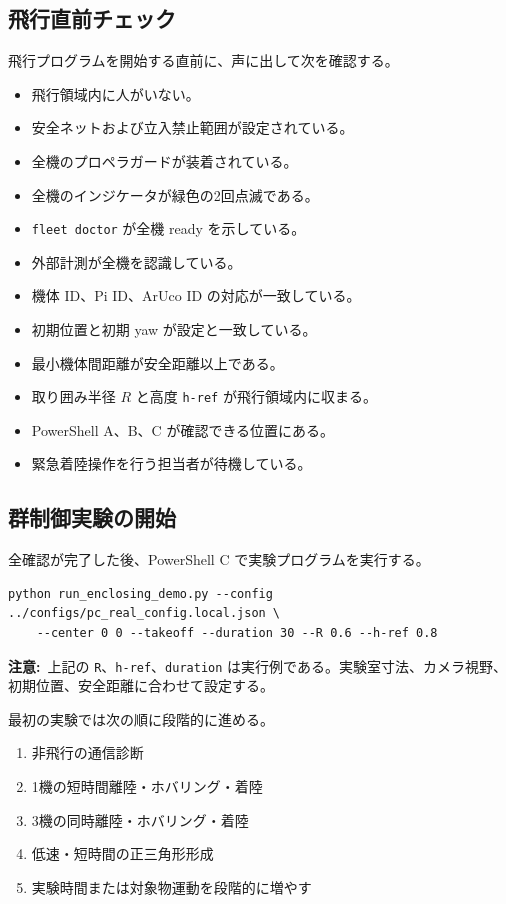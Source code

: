 \documentclass[11pt,a4paper]{ltjsarticle}
\newcommand{\code}[1]{\texttt{\small #1}}
\newcommand{\warning}[1]{\par\smallskip\noindent\textbf{注意:}~#1\par\smallskip}
\begin{document}
\subsection{飛行直前チェック}

飛行プログラムを開始する直前に、声に出して次を確認する。

\begin{itemize}[leftmargin=1.4em]
  \item 飛行領域内に人がいない。
  \item 安全ネットおよび立入禁止範囲が設定されている。
  \item 全機のプロペラガードが装着されている。
  \item 全機のインジケータが緑色の2回点滅である。
  \item \code{fleet doctor} が全機 ready を示している。
  \item 外部計測が全機を認識している。
  \item 機体 ID、Pi ID、ArUco ID の対応が一致している。
  \item 初期位置と初期 yaw が設定と一致している。
  \item 最小機体間距離が安全距離以上である。
  \item 取り囲み半径 $R$ と高度 \code{h-ref} が飛行領域内に収まる。
  \item PowerShell A、B、C が確認できる位置にある。
  \item 緊急着陸操作を行う担当者が待機している。
\end{itemize}

\subsection{群制御実験の開始}

全確認が完了した後、PowerShell C で実験プログラムを実行する。

\begin{lstlisting}
python run_enclosing_demo.py --config ../configs/pc_real_config.local.json \
    --center 0 0 --takeoff --duration 30 --R 0.6 --h-ref 0.8
\end{lstlisting}

\warning{上記の \code{R}、\code{h-ref}、\code{duration} は実行例である。実験室寸法、カメラ視野、初期位置、安全距離に合わせて設定する。}

最初の実験では次の順に段階的に進める。

\begin{enumerate}[leftmargin=1.6em]
  \item 非飛行の通信診断
  \item 1機の短時間離陸・ホバリング・着陸
  \item 3機の同時離陸・ホバリング・着陸
  \item 低速・短時間の正三角形形成
  \item 実験時間または対象物運動を段階的に増やす
\end{enumerate}
\end{document}
